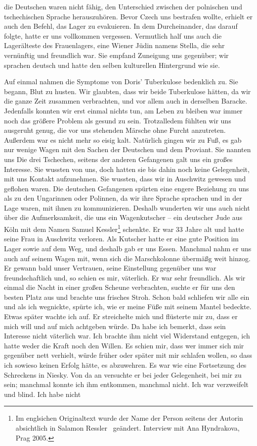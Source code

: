 \documentclass[a4paper,12pt,ngerman,
]{nisebook}
\begin{document}
die Deutschen waren nicht fähig, den Unterschied zwischen der polnischen und tschechischen Sprache herauszuhören. Bevor Czech uns bestrafen wollte, erhielt er auch den Befehl, das Lager zu evakuieren. In dem Durcheinander, das darauf folgte, hatte er uns vollkommen vergessen. Vermutlich half uns auch die Lagerälteste des Frauenlagers, eine Wiener Jüdin namens Stella, die sehr vernünftig und freundlich war. Sie empfand Zuneigung uns gegenüber; wir sprachen deutsch und hatte den selben kulturellen Hintergrund wie sie.

Auf einmal nahmen die Symptome von Doris' Tuberkulose bedenklich zu. Sie begann, Blut zu husten. Wir glaubten, dass wir beide Tuberkulose hätten, da wir die ganze Zeit zusammen verbrachten, und vor allem auch in derselben Baracke. Jedenfalls konnten wir erst einmal nichts tun, am Leben zu bleiben war immer noch das größere Problem als gesund zu sein. Trotzalledem fühlten wir uns ausgeruht genug, die vor uns stehenden Märsche ohne Furcht anzutreten. Außerdem war es nicht mehr so eisig kalt. Natürlich gingen wir zu Fuß, es gab nur wenige Wagen mit den Sachen der Deutschen und dem Proviant. Sie nannten uns \glqq Die drei Tschechen\grqq, seitens der anderen Gefangenen galt uns ein großes Interesse. Sie wussten von uns, doch hatten sie bis dahin noch keine Gelegenheit, mit uns Kontakt aufzunehmen. Sie wussten, dass wir in Auschwitz gewesen und geflohen waren. Die deutschen Gefangenen spürten eine engere Beziehung zu uns als zu den Ungarinnen oder Polinnen, da wir ihre Sprache sprachen und in der Lage waren, mit ihnen zu kommunizieren. Deshalb wunderten wir uns auch nicht über die Aufmerksamkeit, die uns ein Wagenkutscher -- ein deutscher Jude aus Köln mit dem Namen Samuel Kessler\footnote{Im englsichen Originaltext wurde der Name der Person seitens der Autorin absichtlich in \glqq Salamon Ressler \grqq~geändert. Interview mit Ana Hyndrakova, Prag 2005.} schenkte. Er war 33 Jahre alt und hatte seine Frau in Auschwitz verloren. Als Kutscher hatte er eine gute Position im Lager sowie auf dem Weg, und deshalb gab er uns Essen. Manchmal nahm er uns auch auf seinem Wagen mit, wenn sich die Marschkolonne übermäßg weit hinzog. Er gewann bald unser Vertrauen, seine Einstellung gegenüber uns war freundschaftlich und, so schien es mir, väterlich. Er war sehr freundlich. Als wir einmal die Nacht in einer großen Scheune verbrachten, suchte er für uns den besten Platz aus und brachte uns frisches Stroh. Schon bald schliefen wir alle ein und als ich wegnickte, spürte ich, wie er meine Füße mit seinem Mantel bedeckte. Etwas später wachte ich auf. Er streichelte mich und flüsterte mir zu, dass er mich will und auf mich achtgeben würde. Da habe ich bemerkt, dass sein Interesse nicht väterlich war. Ich brachte ihm nicht viel Widerstand entgegen, ich hatte weder die Kraft noch den Willen. Es schien mir, dass wer immer sich mir gegenüber nett verhielt, würde früher oder später mit mir schlafen wollen, so dass ich sowieso keinen Erfolg hätte, es abzuwehren. Es war wie eine Fortsetzung des Schreckens in Niesky. Von da an versuchte er bei jeder Gelegenheit, bei mir zu sein; manchmal konnte ich ihm entkommen, manchmal nicht. Ich war verzweifelt und blind. Ich habe nicht 
\end{document}
